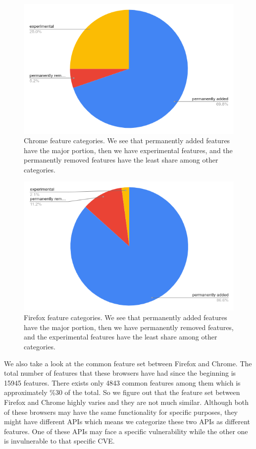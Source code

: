 \begin{figure}[ht]
    \centering
    \includegraphics[width=\columnwidth]{figures/Chrome-feature-categories.png}
    \caption{Chrome feature categories. We see that permanently added features have the major portion, then we have experimental features, and the permanently removed features have the least share among other categories.}
    \label{fig:chrome-categories}
\end{figure}

\begin{figure}[ht]
    \centering
    \includegraphics[width=\columnwidth]{figures/Firefox-feature-categories.png}
    \caption{Firefox feature categories. We see that permanently added features have the major portion, then we have permanently removed features, and the experimental features have the least share among other categories.}
    \label{fig:firefox-categories}
\end{figure}

We also take a look at the common feature set between Firefox and Chrome. The total number of features that these browsers have had since the beginning is 15945 features. There exists only 4843 common features among them which is approximately \%30 of the total. So we figure out that the feature set between Firefox and Chrome highly varies and they are not much similar. Although both of these browsers may have the same functionality for specific purposes, they might have different APIs which means we categorize these two APIs as different features. One of these APIs may face a specific vulnerability while the other one is invulnerable to that specific CVE.

